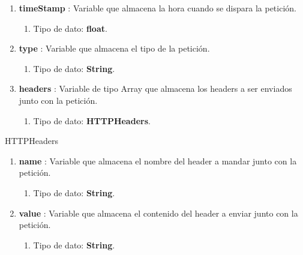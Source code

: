 \documentclass[12pt, a4paper, titlepage]{report}
\begin{document}
\begin{enumerate}
\begin{enumerate}
    		        \end{enumerate}
    		        \item \textbf{timeStamp} : Variable que almacena la hora cuando se dispara la petición.
    		        \begin{enumerate}
    		            \item Tipo de dato: \textbf{float}.
    		        \end{enumerate}
    		        \item \textbf{type} : Variable que almacena el tipo de la petición.
    		        \begin{enumerate}
    		            \item Tipo de dato: \textbf{String}.
    		        \end{enumerate}
    		        \item \textbf{headers} : Variable de tipo Array que almacena los headers a ser enviados junto con la petición.
    		        \begin{enumerate}
    		            \item Tipo de dato: \textbf{HTTPHeaders}.
    		        \end{enumerate}
			    \end{enumerate}
			    
			    HTTPHeaders
			    \begin{enumerate}
    		        \item \textbf{name} : Variable que almacena el nombre del header a mandar junto con la petición.
    		        \begin{enumerate}
    		            \item Tipo de dato: \textbf{String}.
    		        \end{enumerate}
    		        \item \textbf{value} : Variable que almacena el contenido del header a enviar junto con la petición.
    		        \begin{enumerate}
    		            \item Tipo de dato: \textbf{String}.
    		        \end{enumerate}
			    \end{enumerate}
			    
\end{document}
